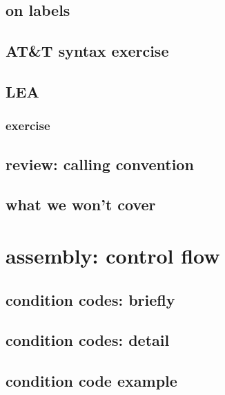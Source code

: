 \subsection{on labels}


\subsection{AT\&T syntax exercise}


\subsection{LEA}


\subsubsection{exercise}


\subsection{review: calling convention}


\subsection{what we won't cover}


\section{assembly: control flow}

\subsection{condition codes: briefly}


\subsection{condition codes: detail}


\subsection{condition code example}



